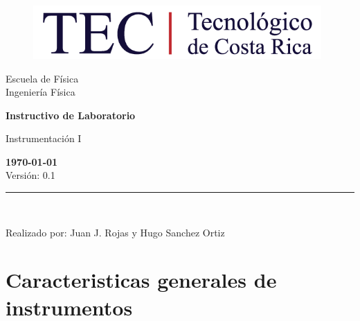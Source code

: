 \documentclass[12pt,letterpaper]{report}
\begin{document}
\begin{titlepage}

\begin{center}
\vspace*{1in}
\begin{figure}[htb]
\begin{center}
\includegraphics[width=11cm]{fig/logo.png}
\end{center}
\end{figure}
\vspace*{0.4in}
\begin{Large}
Escuela de Física\\
\vspace*{0.15in}
Ingeniería Física\\
\vspace*{0.8in}
\end{Large}
\vspace*{0.2in}
\begin{Large}
\textbf{Instructivo de Laboratorio} \\
\end{Large}
\vspace*{0.3in}
\begin{large}
Instrumentación I\\
\end{large}
\vspace*{2.5in}
\begin{Large}
\textbf{\today}\\
Versión: 0.1\\
\end{Large}
\rule{80mm}{0.1mm}\\
\vspace*{0.1in}
\begin{large}
Realizado por: Juan J. Rojas y Hugo Sanchez Ortiz\\
\end{large}
\end{center}

\end{titlepage}

\tableofcontents

\chapter{Caracteristicas generales de instrumentos}
\end{document}

